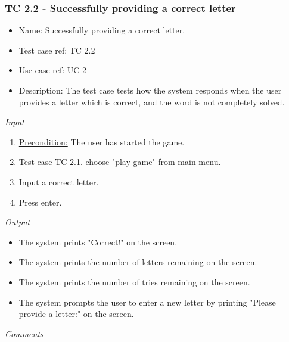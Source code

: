 \documentclass[12pt, letterpaper]{article}
\begin{document}
\subsubsection{TC 2.2 - Successfully providing a correct letter}
\begin{itemize}
	\item Name: Successfully providing a correct letter.
	\item Test case ref: TC 2.2
	\item Use case ref: UC 2
	\item Description: The test case tests how the system responds when the user provides a letter which is correct, and the word is not completely solved.
\end{itemize}
\emph{Input}
\begin{enumerate}
	\item \underline{Precondition:} The user has started the game.
	\item Test case TC 2.1. choose "play game" from main menu.
	\item Input a correct letter.
	\item Press enter.
\end{enumerate}
\emph{Output}
\begin{itemize}
	\item The system prints "Correct!" on the screen.
	\item The system prints the number of letters remaining on the screen.
	\item The system prints the number of tries remaining on the screen.
	\item The system prompts the user to enter a new letter by printing "Please provide a letter:" on the screen.
\end{itemize}
\begin{Form}
	\newline
	\newline
\end{Form}
\newline
\emph{Comments}
\newline
\newline
\newline
\newline
\newline
\newline
\newline
\end{document}
